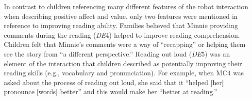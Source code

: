 \documentclass{sigchi}
\begin{document}
%	

In contrast to children referencing many different features of the robot interaction when describing positive affect and value, only two features were mentioned in reference to improving reading ability. Families believed that Minnie providing comments during the reading (\textit{DE}4) helped to improve reading comprehension. Children felt that Minnie's comments were a way of ``recapping'' or helping them see the story from ``a different perspective.'' Reading out loud (\textit{DE}5) was an element of the interaction that children described as potentially improving their reading skills (e.g., vocabulary and pronunciation). For example, when MC4 was asked about the process of reading out loud, she said that it ``helped [her] pronounce [words] better'' and this would make her ``better at reading.''
\end{document}
